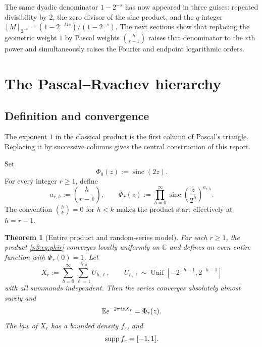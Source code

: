 \documentclass[11pt,oneside]{article}
\newtheorem{theorem}{Theorem}[section]
\theoremstyle{definition}
\theoremstyle{remark}
\newcommand{\C}{\mathbb C}
\newcommand{\sinc}{\operatorname{sinc}}
\begin{document}
\begin{resultbox}
The same dyadic denominator $1-2^{-s}$ has now appeared in three guises: repeated divisibility by $2$, the zero divisor of the sinc product, and the $q$-integer $[M]_{2^{-s}}=(1-2^{-Ms})/(1-2^{-s})$.  The next sections show that replacing the geometric weight $1$ by Pascal weights $\binom h{r-1}$ raises that denominator to the $r$th power and simultaneously raises the Fourier and endpoint logarithmic orders.
\end{resultbox}

\section{The Pascal--Rvachev hierarchy}\label{p3:sec:hierarchy}

\subsection{Definition and convergence}

The exponent $1$ in the classical product is the first column of Pascal's triangle.  Replacing it by successive columns gives the central construction of this report.

\begin{definition}\label{p3:def:pascal-rvachev}
Set
\begin{equation}\label{p3:eq:phi0}
  \Phi_0(z):=\sinc(2z).
\end{equation}
For every integer $r\ge1$, define
\begin{equation}\label{p3:eq:phir}
  a_{r,h}:=\binom h{r-1},
  \qquad
  \Phi_r(z):=\prod_{h=0}^{\infty}
  \sinc\!\left(\frac z{2^h}\right)^{a_{r,h}}.
\end{equation}
The convention $\binom hk=0$ for $h<k$ makes the product start effectively at $h=r-1$.
\end{definition}

\begin{theorem}[Entire product and random-series model]\label{p3:thm:random-series}
For each $r\ge1$, the product \eqref{p3:eq:phir} converges locally uniformly on $\C$ and defines an even entire function with $\Phi_r(0)=1$.  Let
\begin{equation}\label{p3:eq:Xr}
  X_r:=\sum_{h=0}^{\infty}\sum_{\ell=1}^{a_{r,h}}U_{h,\ell},
  \qquad
  U_{h,\ell}\sim\operatorname{Unif}
  \!\left[-2^{-h-1},2^{-h-1}\right]
\end{equation}
with all summands independent.  Then the series converges absolutely almost surely and
\begin{equation}\label{p3:eq:char-Xr}
  \mathbb E e^{-2\pi i zX_r}=\Phi_r(z).
\end{equation}
The law of $X_r$ has a bounded density $f_r$, and
\begin{equation}\label{p3:eq:support}
  \operatorname{supp} f_r=[-1,1].
\end{equation}
\end{theorem}
\end{document}
